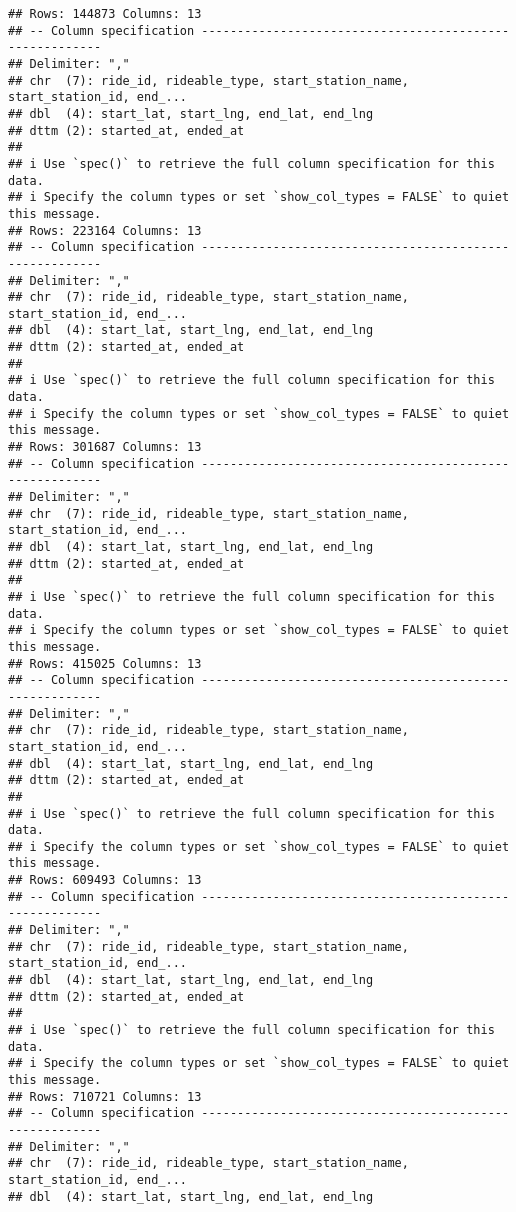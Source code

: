 \documentclass[
]{article}
\begin{document}
\begin{verbatim}
## Rows: 144873 Columns: 13
## -- Column specification --------------------------------------------------------
## Delimiter: ","
## chr  (7): ride_id, rideable_type, start_station_name, start_station_id, end_...
## dbl  (4): start_lat, start_lng, end_lat, end_lng
## dttm (2): started_at, ended_at
## 
## i Use `spec()` to retrieve the full column specification for this data.
## i Specify the column types or set `show_col_types = FALSE` to quiet this message.
## Rows: 223164 Columns: 13
## -- Column specification --------------------------------------------------------
## Delimiter: ","
## chr  (7): ride_id, rideable_type, start_station_name, start_station_id, end_...
## dbl  (4): start_lat, start_lng, end_lat, end_lng
## dttm (2): started_at, ended_at
## 
## i Use `spec()` to retrieve the full column specification for this data.
## i Specify the column types or set `show_col_types = FALSE` to quiet this message.
## Rows: 301687 Columns: 13
## -- Column specification --------------------------------------------------------
## Delimiter: ","
## chr  (7): ride_id, rideable_type, start_station_name, start_station_id, end_...
## dbl  (4): start_lat, start_lng, end_lat, end_lng
## dttm (2): started_at, ended_at
## 
## i Use `spec()` to retrieve the full column specification for this data.
## i Specify the column types or set `show_col_types = FALSE` to quiet this message.
## Rows: 415025 Columns: 13
## -- Column specification --------------------------------------------------------
## Delimiter: ","
## chr  (7): ride_id, rideable_type, start_station_name, start_station_id, end_...
## dbl  (4): start_lat, start_lng, end_lat, end_lng
## dttm (2): started_at, ended_at
## 
## i Use `spec()` to retrieve the full column specification for this data.
## i Specify the column types or set `show_col_types = FALSE` to quiet this message.
## Rows: 609493 Columns: 13
## -- Column specification --------------------------------------------------------
## Delimiter: ","
## chr  (7): ride_id, rideable_type, start_station_name, start_station_id, end_...
## dbl  (4): start_lat, start_lng, end_lat, end_lng
## dttm (2): started_at, ended_at
## 
## i Use `spec()` to retrieve the full column specification for this data.
## i Specify the column types or set `show_col_types = FALSE` to quiet this message.
## Rows: 710721 Columns: 13
## -- Column specification --------------------------------------------------------
## Delimiter: ","
## chr  (7): ride_id, rideable_type, start_station_name, start_station_id, end_...
## dbl  (4): start_lat, start_lng, end_lat, end_lng

\end{verbatim}
\end{document}
